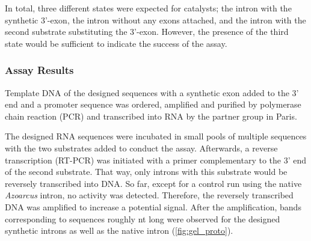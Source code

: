 \documentclass[../../master.tex]{subfiles}
\begin{document}
In total, three different states were expected for catalysts; the intron with the synthetic 3'-exon, the intron without any exons attached, and the intron with the second substrate substituting the 3'-exon.
However, the presence of the third state would be sufficient to indicate the success of the assay.

\subsubsection{Assay Results}
\label{ssub:exp_results:assayresults}


Template DNA of the designed sequences with a synthetic exon added to the 3' end and a promoter sequence was ordered, amplified and purified by polymerase chain reaction (PCR) and transcribed into RNA by the partner group in Paris.

The designed RNA sequences were incubated in small pools of multiple sequences with the two substrates added to conduct the assay.
Afterwards, a reverse transcription (RT-PCR) was initiated with a primer complementary to the 3' end of the second substrate.
That way, only introns with this substrate would be reversely transcribed into DNA.
So far, except for a control run using the native \textit{Azoarcus} intron, no activity was detected.
Therefore, the reversely transcribed DNA was amplified to increase a potential signal.
After the amplification, bands corresponding to sequences roughly \unit[200]{nt} long were observed for the designed synthetic introns as well as the native
intron (\autoref{fig:gel_proto}).
\end{document}
